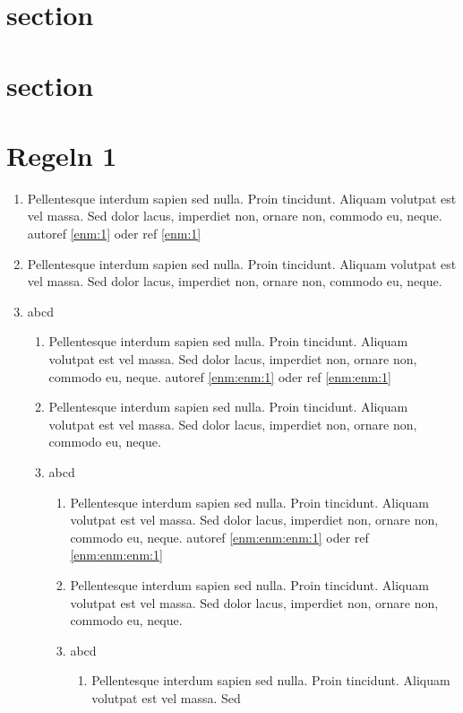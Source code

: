 \documentclass[ngerman]{scrartcl}
\begin{document}
	\section{section}
	\lipsum[1-5]

	\section{section}
	\lipsum[1-25]

	\section{Regeln 1}

	\begin{enumerate}
		\item Pellentesque interdum sapien sed nulla. Proin tincidunt. Aliquam volutpat est vel massa. Sed
dolor lacus, imperdiet non, ornare non, commodo eu, neque.
					autoref \autoref{enm:1} oder ref \ref{enm:1}
		\item Pellentesque interdum sapien sed nulla. Proin tincidunt. Aliquam volutpat est vel massa. Sed
dolor lacus, imperdiet non, ornare non, commodo eu, neque.\label{enm:1}
		\item abcd
			\begin{enumerate}
				\item Pellentesque interdum sapien sed nulla. Proin tincidunt. Aliquam volutpat est vel massa. Sed
dolor lacus, imperdiet non, ornare non, commodo eu, neque.
							autoref \autoref{enm:enm:1} oder ref \ref{enm:enm:1}
				\item Pellentesque interdum sapien sed nulla. Proin tincidunt. Aliquam volutpat est vel massa. Sed
dolor lacus, imperdiet non, ornare non, commodo eu, neque.\label{enm:enm:1}
				\item abcd
					\begin{enumerate}
						\item Pellentesque interdum sapien sed nulla. Proin tincidunt. Aliquam volutpat est vel massa. Sed
dolor lacus, imperdiet non, ornare non, commodo eu, neque.
									autoref \autoref{enm:enm:enm:1} oder ref \ref{enm:enm:enm:1}
						\item Pellentesque interdum sapien sed nulla. Proin tincidunt. Aliquam volutpat est vel massa. Sed
dolor lacus, imperdiet non, ornare non, commodo eu, neque.\label{enm:enm:enm:1}
						\item abcd
							\begin{enumerate}
								\item Pellentesque interdum sapien sed nulla. Proin tincidunt. Aliquam volutpat est vel massa. Sed

\end{enumerate}
\end{enumerate}
\end{enumerate}
\end{enumerate}
\end{document}
